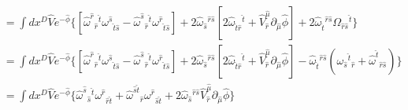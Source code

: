 \documentclass{article}
\begin{document}
\begin{equation}
\begin{aligned}
        &= \int d x^D\hat V e^{-\hat \phi} \{  [\hat \omega^{\hat r}{}_{\hat r}{}^{\hat t}\omega^{\hat s}{}_{\hat t \hat s} - \hat \omega^{\hat s}{}_{ \hat r}{}^{\hat t}\omega^{\hat r}{}_{ \hat t \hat s}]+ 2\hat \omega_{\hat s}{}^{\hat r \hat s}[2 \hat \omega_{ \hat t \hat r}{}^{\hat t}+  \hat V^{\hat \mu}_{ \hat r}\partial_{\hat \mu}\hat \phi ] + 2\hat \omega_{\hat t}{}^{\hat r \hat s} \Omega_{ \hat r \hat s}{}^{\hat t}\}\\
        &= \int d x^D\hat V e^{-\hat \phi} \{  [\hat \omega^{\hat r}{}_{\hat r}{}^{\hat t}\omega^{\hat s}{}_{\hat t \hat s} - \hat \omega^{\hat s}{}_{ \hat r}{}^{\hat t}\omega^{\hat r}{}_{ \hat t \hat s}]+ 2\hat \omega_{\hat s}{}^{\hat r \hat s}[2 \hat \omega_{ \hat t \hat r}{}^{\hat t}+  \hat V^{\hat \mu}_{ \hat r}\partial_{\hat \mu}\hat \phi ] - \hat \omega_{\hat t}{}^{\hat r \hat s}( \omega_{ \hat s}{}^{ \hat t}{}_{\hat r}+ \hat \omega^{\hat t}{}_{\hat  r \hat s })\}\\
        &= \int d x^D\hat V e^{-\hat \phi} \{  \hat \omega^{\hat s}{}_{\hat s}{}^{\hat t}\omega^{\hat r}{}_{\hat r \hat t} + \hat \omega^{\hat s \hat t}{}_{ \hat r}\omega^{\hat r}{}_{  \hat s \hat t }+ 2\hat \omega_{\hat s}{}^{\hat r \hat s}\hat V^{\hat \mu}_{ \hat r}\partial_{\hat \mu}\hat \phi \}\\
    \end{aligned}
\end{equation}
\end{document}
